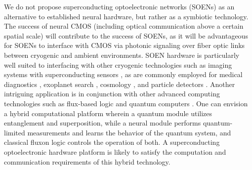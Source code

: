 \documentclass[twocolumn]{article}
\begin{document}
We do not propose superconducting optoelectronic networks (SOENs) as an alternative to established neural hardware, but rather as a symbiotic technology. The success of neural CMOS (including optical communication above a certain spatial scale) will contribute to the success of SOENs, as it will be advantageous for SOENs to interface with CMOS via photonic signaling over fiber optic links between cryogenic and ambient environments. SOEN hardware is particularly well suited to interfacing with other cryogenic technologies such as imaging systems with superconducting sensors  \cite{alve2015,chsc2017}, as are commonly employed for medical diagnostics \cite{hada2016}, exoplanet search \cite{raca2016,boga1992,kila2016}, cosmology \cite{diad2017}, and particle detectors \cite{le2017}. Another intriguing application is in conjunction with other advanced computing technologies such as flux-based logic \cite{li2012,taoz2013,hehe2011} and quantum computers \cite{nich2000,blga2007,Zwanenburg2013,Hill,we2017}. One can envision a hybrid computational platform \cite{deli2017,posc2017} wherein a quantum module utilizes entanglement and superposition, while a neural module performs quantum-limited measurements and learns the behavior of the quantum system, and classical fluxon logic controls the operation of both. A superconducting optoelectronic hardware platform is likely to satisfy the computation and communication requirements of this hybrid technology. 

\end{document}
